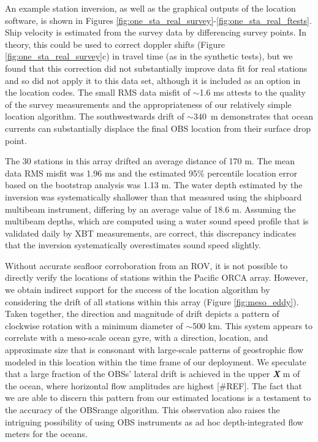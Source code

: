 An example station inversion, as well as the graphical outputs of the location software, is shown in Figures \ref{fig:one_sta_real_survey}-\ref{fig:one_sta_real_ftests}. Ship velocity is estimated from the survey data by differencing survey points. In theory, this could be used to correct doppler shifts (Figure \ref{fig:one_sta_real_survey}c) in travel time (as in the synthetic tests), but we found that this correction did not substantially improve data fit for real stations and so did not apply it to this data set, although it is included as an option in the location codes. The small RMS data misfit of $\sim$1.6 ms attests to the quality of the survey measurements and the appropriateness of our relatively simple location algorithm. The southwestwards drift of \mbox{$\sim340$ m} demonstrates that ocean currents can substantially displace the final OBS location from their surface drop point. 

The 30 stations in this array drifted an average distance of 170 m. The mean data RMS misfit was 1.96 ms and the estimated 95\% percentile location error based on the bootstrap analysis was 1.13 m. The water depth estimated by the inversion was systematically shallower than that measured using the shipboard multibeam instrument, differing by an average value of 18.6 m. Assuming the multibeam depths, which are computed using a water sound speed profile that is validated daily by XBT measurements, are correct, this discrepancy indicates that the inversion systematically overestimates sound speed slightly. 

Without accurate seafloor corroboration from an ROV, it is not possible to directly verify the locations of stations within the Pacific ORCA array. However, we  obtain indirect support for the success of the location algorithm by considering the drift of all stations within this array (Figure \ref{fig:meso_eddy}). Taken together, the direction and magnitude of drift depicts a pattern of clockwise rotation with a minimum diameter of $\sim$500 km. This system appears to correlate with a meso-scale ocean gyre, with a direction, location, and approximate size that is consonant with large-scale patterns of geostrophic flow modeled in this location within the time frame of our deployment. We speculate that a large fraction of the OBSs' lateral drift is achieved in the upper \textit{\textbf{X}} m of the ocean, where horizontal flow amplitudes are highest [\#REF]. The fact that we are able to discern this pattern from our estimated locations is a testament to the accuracy of the OBSrange algorithm. This observation also raises the intriguing possibility of using OBS instruments as ad hoc depth-integrated flow meters for the oceans. 

